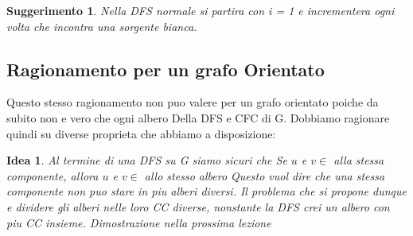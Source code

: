 \newtheorem{consCFCnonorientato}{Suggerimento}

\begin{consCFCnonorientato}
	Nella DFS normale si partira con i = 1 e incrementera ogni volta che incontra una sorgente bianca.
\end{consCFCnonorientato}

\subsection{Ragionamento per un grafo Orientato}
Questo stesso ragionamento non puo valere per un grafo orientato poiche da subito non e vero che ogni albero Della DFS e CFC di G.
Dobbiamo ragionare quindi su diverse proprieta che abbiamo a disposizione:
\newtheorem{ideaorientato}{Idea}
\begin{ideaorientato}
	\item Al termine di una DFS su G siamo sicuri che 
		\subitem Se $u$ e $v \in$ alla stessa componente, allora $u$ e $v \in$  allo stesso albero
		Questo vuol dire che una stessa componente non puo stare in piu alberi diversi. Il problema che si propone dunque e dividere gli alberi nelle loro CC diverse, nonstante la DFS crei un albero con piu CC insieme.
		Dimostrazione nella prossima lezione
\end{ideaorientato}


